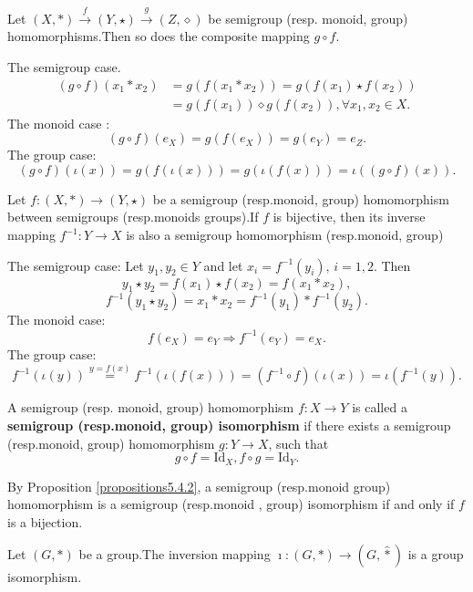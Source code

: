 \documentclass{book}
\numberwithin{equation}{section}
\begin{document}
\begin{propositionenv}\label{propositions5.4.2}
    Let $(X, *)\overset{f}{\rightarrow} (Y, \star)\overset{g}{\rightarrow}(Z, \diamond ) $ be semigroup (resp. monoid,  group) homomorphisms.Then so does the composite mapping $g\circ f$.
\end{propositionenv}
\begin{proofenv}
    The semigroup case.
        \begin{align*}
            (g\circ f)(x_1*x_2) & = g(f(x_1*x_2))  = g(f(x_1)\star f(x_2)) \\
            & = g(f(x_1))\diamond g(f(x_2)), \forall x_1, x_2\in X.
        \end{align*}
    The monoid case :
    $$(g\circ f)(e_X)=g(f(e_X))=g(e_Y)=e_Z.$$
    The group case:
    $$(g\circ f)(\iota(x))=g(f(\iota(x)))=g(\iota(f(x)))=\iota((g\circ f)(x)).$$
\end{proofenv}
\begin{propositionenv}
    Let $f:(X, *)\rightarrow (Y, \star)$ be a semigroup (resp.monoid,  group) homomorphism between semigroups (resp.monoids groups).If $f$ is bijective,  then its inverse mapping $f^{-1}:Y\rightarrow X$ is also a semigroup homomorphism (resp.monoid, group) 
\end{propositionenv}
\begin{proofenv}
    The semigroup case: Let $y_1, y_2\in Y$ and let $x_i=f^{-1}(y_i), \, i=1, 2$. Then 
    $$y_1\star y_2=f(x_1)\star f(x_2)=f(x_1*x_2), $$
    $$f^{-1}(y_1\star y_2)=x_1*x_2=f^{-1}(y_1)*f^{-1}(y_2).$$
    The monoid case:
    $$f(e_X)=e_Y\Rightarrow f^{-1}(e_Y)=e_X.$$
    The group case:
    $$f^{-1}(\iota(y))\overset{y=f(x)}{=}f^{-1}(\iota(f(x)))=(f^{-1}\circ f)(\iota(x))=\iota(f^{-1}(y)).$$
\end{proofenv}
\begin{definitionenv}
    A semigroup (resp. monoid,  group) homomorphism $f:X\rightarrow Y$ is called a \textbf{semigroup (resp.monoid, group) isomorphism} if there exists a semigroup (resp.monoid, group) homomorphism $g:Y\rightarrow X$,  such that 
    $$g\circ f=\mathrm{Id}_X, f\circ g=\mathrm{Id}_Y.$$
\end{definitionenv}
By Proposition \ref{propositions5.4.2},  a semigroup (resp.monoid group) homomorphism is a semigroup (resp.monoid , group) isomorphism if and only if $f$ is a bijection.
\begin{propositionenv}
    Let $(G, *)$ be a group.The inversion mapping $\imath :(G, *)\rightarrow(G, \hat{*})$ is a group isomorphism.
\end{propositionenv}
\end{document}
